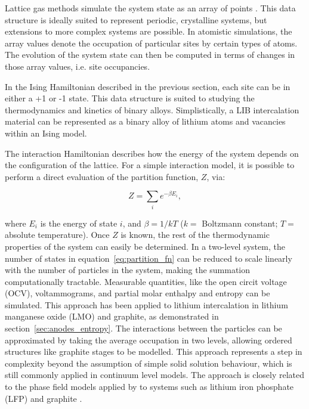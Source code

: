 \documentclass[../main.tex]{subfiles}
\begin{document}
Lattice gas methods simulate the system state as an array of points \cite{Binder2009book}. This data structure is ideally suited to represent periodic, crystalline systems, but extensions to more complex systems are possible. In atomistic simulations, the array values denote the occupation of particular sites by certain types of atoms. The evolution of the system state can then be computed in terms of changes in those array values, i.e. site occupancies.\cite{Binder2009book}
    
In the Ising Hamiltonian described in the previous section, each site can be in either a +1 or -1 state.\cite{lee1952} This data structure is suited to studying the thermodynamics and kinetics of binary alloys.\cite{PMERCER2016394,oviedo2015underpotential} Simplistically, a LIB intercalation material can be represented as a binary alloy of lithium atoms and vacancies within an Ising model.\cite{persson2010,mercer_influence_2017,Kim2001h}   
    
The interaction Hamiltonian describes how the energy of the system depends on the configuration of the lattice. For a simple interaction model, it is possible to perform a direct evaluation of the partition function, $Z$, via:
    
\begin{equation}
        Z = \sum_{i}e^{-\beta E_{i}},
        \label{eq:partition_fn}
\end{equation}

where $E_{i}$ is the energy of state $i$, and $\beta = 1/kT$ ($k =$ Boltzmann constant; $T=$ absolute temperature). Once $Z$ is known, the rest of the thermodynamic properties of the system can easily be determined.\cite{Mercer2019,Leiva2017b,schlueter_quantifying_2018} In a two-level system,\cite{Leiva2017b} the number of states in equation~\ref{eq:partition_fn} can be reduced to scale linearly with the number of particles in the system, making the summation computationally tractable.\cite{Mercer2019,Leiva2017b,schlueter_quantifying_2018} Measurable quantities, like the open circit voltage (OCV), voltammograms, and partial molar enthalpy and entropy can be simulated.\cite{schlueter_quantifying_2018,Leiva2017b,Mercer2019} This approach has been applied to lithium intercalation in lithium manganese oxide (LMO) \cite{schlueter_quantifying_2018} and graphite,\cite{Mercer2019,Leiva2017b} as demonstrated in section~\ref{sec:anodes_entropy}. The interactions between the particles can be approximated by taking the average occupation in two levels, allowing ordered structures like graphite stages to be modelled. This approach represents a step in complexity beyond the assumption of simple solid solution behaviour, which is still commonly applied in continuum level models. \citeauthor{HAFTBARADARAN2011361} The approach is closely related to the phase field models applied by \citeauthor{Bazant2017} to systems such as lithium iron phosphate (LFP) and graphite \cite{Bazant2017,guo2016,peng2011}.
\end{document}
